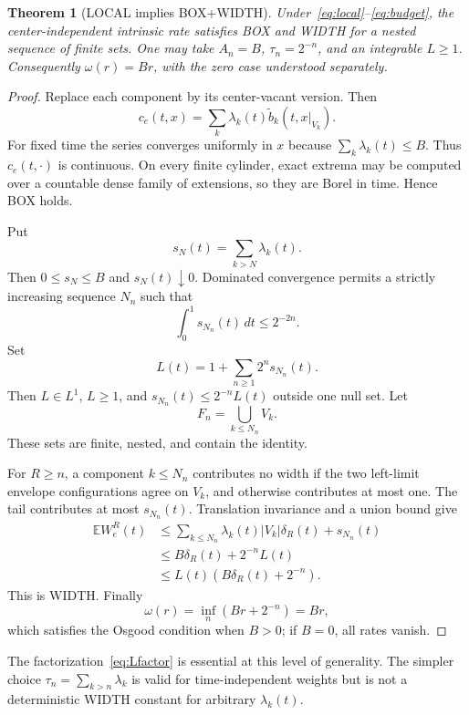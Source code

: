 \documentclass[11pt]{article}
\newtheorem{theorem}{Theorem}[section]
\theoremstyle{definition}
\theoremstyle{remark}
\newcommand{\E}{\mathbb{E}}
\newcommand{\1}{\mathbf{1}}
\begin{document}
\begin{theorem}[LOCAL implies BOX+WIDTH]
Under~\eqref{eq:local}--\eqref{eq:budget}, the center-independent intrinsic
rate satisfies BOX and WIDTH for a nested sequence of finite sets.  One may
take $A_n=B$, $\tau_n=2^{-n}$, and an integrable $L\ge1$.  Consequently
$\omega(r)=Br$, with the zero case understood separately.
\end{theorem}

\begin{proof}
Replace each component by its center-vacant version.  Then
\[
 c_e(t,x)=\sum_k\lambda_k(t)\widetilde b_k(t,x|_{V_k}).
\]
For fixed time the series converges uniformly in $x$ because
$\sum_k\lambda_k(t)\le B$.  Thus $c_e(t,\cdot)$ is continuous.  On every
finite cylinder, exact extrema may be computed over a countable dense family
of extensions, so they are Borel in time.  Hence BOX holds.

Put
\[
 s_N(t)=\sum_{k>N}\lambda_k(t).
\]
Then $0\le s_N\le B$ and $s_N(t)\downarrow0$.  Dominated convergence permits
a strictly increasing sequence $N_n$ such that
\[
 \int_0^1s_{N_n}(t)\,dt\le2^{-2n}.
\]
Set
\begin{equation}
 L(t)=1+\sum_{n\ge1}2^ns_{N_n}(t).
 \label{eq:Lfactor}
\end{equation}
Then $L\in L^1$, $L\ge1$, and
$s_{N_n}(t)\le2^{-n}L(t)$ outside one null set.  Let
\[
 F_n=\bigcup_{k\le N_n}V_k.
\]
These sets are finite, nested, and contain the identity.

For $R\ge n$, a component $k\le N_n$ contributes no width if the two
left-limit envelope configurations agree on $V_k$, and otherwise contributes
at most one.  The tail contributes at most $s_{N_n}(t)$.  Translation
invariance and a union bound give
\begin{align*}
 \E W_e^R(t)
 &\le\sum_{k\le N_n}\lambda_k(t)|V_k|\delta_R(t)+s_{N_n}(t)\\
 &\le B\delta_R(t)+2^{-n}L(t)\\
 &\le L(t)(B\delta_R(t)+2^{-n}).
\end{align*}
This is WIDTH.  Finally
\[
 \omega(r)=\inf_n(Br+2^{-n})=Br,
\]
which satisfies the Osgood condition when $B>0$; if $B=0$, all rates vanish.
\end{proof}

The factorization~\eqref{eq:Lfactor} is essential at this level of
generality.  The simpler choice
$\tau_n=\sum_{k>n}\lambda_k$ is valid for time-independent weights but is not
a deterministic WIDTH constant for arbitrary $\lambda_k(t)$.
\end{document}
